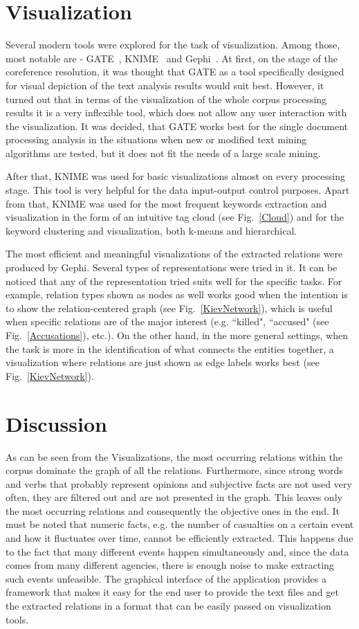 \documentclass[]{article}
\begin{document}
\section{Visualization}
%
Several modern tools were explored for the task of visualization. Among those, most notable are - GATE~\cite{gate}, KNIME~\cite{knime} and Gephi~\cite{gephi}. At first, on the stage of the coreference resolution, it was thought that GATE as a tool specifically designed for visual depiction of the text analysis results would suit best. However, it turned out that in terms of the visualization of the whole corpus processing results it is a very inflexible tool, which does not allow any user interaction with the visualization. It was decided, that GATE works best for the single document processing analysis in the situations when new or modified text mining algorithms are tested, but it does not fit the needs of a large scale mining.

After that, KNIME was used for basic visualizations almost on every processing stage. This tool is very helpful for the data input-output control purposes. Apart from that, KNIME was used for the most frequent keywords extraction and visualization in the form of an intuitive tag cloud (see Fig.~\ref{Cloud}) and for the keyword clustering and visualization, both k-means and hierarchical.

The most efficient and meaningful visualizations of the extracted relations were produced by Gephi. Several types of representations were tried in it. It can be noticed that any of the representation tried suits well for the specific tasks. For example, relation types shown as nodes as well works good when the intention is to show the relation-centered graph (see Fig.~\ref{KievNetwork}), which is useful when specific relations are of the major interest (e.g. ``killed", ``accused" (see Fig.~\ref{Accusations}), etc.). On the other hand, in the more general settings, when the task is more in the identification of what connects the entities together, a visualization where relations are just shown as edge labels works best (see Fig.~\ref{KievNetwork}).

% 
\section{Discussion}
%
As can be seen from the Visualizations, the most occurring relations within the corpus dominate the graph of all the relations. Furthermore, since strong words and verbs that probably represent opinions and subjective facts are not used very often, they are filtered out and are not presented in the graph. This leaves only the most occurring relations and consequently the objective ones in the end. It must be noted that numeric facts, e.g. the number of casualties on a certain event and how it fluctuates over time, cannot be efficiently extracted. This happens due to the fact that many different events happen simultaneously and, since the data comes from many different agencies, there is enough noise to make extracting such events unfeasible. The graphical interface of the application provides a framework that makes it easy for the end user to provide the text files and get the extracted relations in a format that can be easily passed on visualization tools. 
\end{document}
